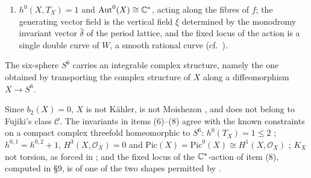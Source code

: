 \begin{theorem}
\begin{enumerate}[label=(\arabic*)]
\item $h^0(X,T_X) = 1$ and $\mathrm{Aut}^0(X) \cong \mathbb{C}^*$, acting along the fibres of $f$; the generating vector field is the vertical field $\xi$ determined by the monodromy invariant vector $\hat\delta$ of the period lattice, and the fixed locus of the action is a single double curve of $W$, a smooth rational curve (cf.\ \cite[Prop.\ 2.5]{HKP}).
\end{enumerate}
\end{theorem}

\begin{corollary}
The six-sphere $S^6$ carries an integrable complex structure, namely the one obtained by transporting the complex structure of $X$ along a diffeomorphism $X \to S^6$.
\end{corollary}

\begin{remark}
Since $b_2(X) = 0$, $X$ is not K\"ahler, is not Moishezon \cite[Lemma 1.4]{CDP98}, and does not belong to Fujiki's class $\mathcal C$. The invariants in items (6)--(8) agree with the known constraints on a compact complex threefold homeomorphic to $S^6$: $h^0(T_X) = 1 \le 2$ \cite[Cor.\ 1.3]{HKP}; $h^{0,1} = h^{0,2}+1$, $H^3(X,\mathcal O_X) = 0$ and $\mathrm{Pic}(X) = \mathrm{Pic}^0(X) \cong H^1(X,\mathcal O_X)$ \cite[Cor.\ 10.2]{HKP}; $K_X$ not torsion, as forced in \cite[\S10]{HKP}; and the fixed locus of the $\mathbb{C}^*$-action of item (8), computed in \S9, is of one of the two shapes permitted by \cite[Prop.\ 2.5]{HKP}.
\end{remark}

